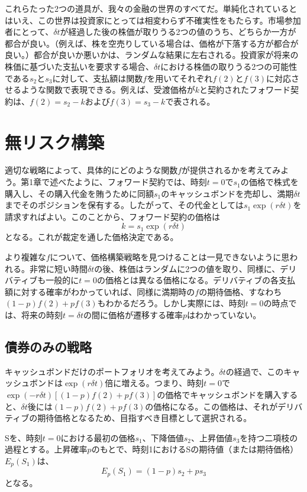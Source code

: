 \documentclass[uplatex,a4j,12pt,dvipdfmx]{jsarticle}
\begin{document}
これらたった2つの道具が、我々の金融の世界のすべてだ。単純化されているとはいえ、この世界は投資家にとっては相変わらず不確実性をもたらす。市場参加者にとって、$\delta t$が経過した後の株価が取りうる2つの値のうち、どちらか一方が都合が良い。（例えば、株を空売りしている場合は、価格が下落する方が都合が良い。）都合が良いか悪いかは、ランダムな結果に左右される。投資家が将来の株価に基づいた支払いを要求する場合、$\delta t$における株価の取りうる2つの可能性である$s_2$と$s_3$に対して、支払額は関数$f$を用いてそれぞれ$f(2)$と$f(3)$に対応させるような関数で表現できる。例えば、受渡価格が$k$と契約されたフォワード契約は、$f(2)=s_2-k$および$f(3)=s_3-k$で表される。

\section{無リスク構築}
適切な戦略によって、具体的にどのような関数$f$が提供されるかを考えてみよう。第1章で述べたように、フォワード契約では、時刻$t=0$で$s_1$の価格で株式を購入し、その購入代金を賄うために同額$s_1$のキャッシュボンドを売却し、満期$\delta t$までそのポジションを保有する。したがって、その代金としては$s_1 \exp(r\delta t)$を請求すればよい。このことから、フォワード契約の価格は\[k = s_1 \exp(r\delta t)\]となる。これが裁定を通した価格決定である。

より複雑な$f$について、価格構築戦略を見つけることは一見できないように思われる。非常に短い時間$\delta t$の後、株価はランダムに2つの値を取り、同様に、デリバティブも一般的に$t=0$の価格とは異なる価格になる。デリバティブの各支払額に対する確率がわかっていれば、同様に満期時の$f$の期待価格、すなわち$(1-p)f(2) + pf(3)$もわかるだろう。しかし実際には、時刻$t=0$の時点では、将来の時刻$t=\delta t$の間に価格が遷移する確率$p$はわかっていない。

\subsection{債券のみの戦略}
キャッシュボンドだけのポートフォリオを考えてみよう。$\delta t$の経過で、このキャッシュボンドは$\exp(r\delta t)$倍に増える。つまり、時刻$t=0$で$\exp(-r\delta t)[(1-p)f(2) + pf(3)]$の価格でキャッシュボンドを購入すると、$\delta t$後には$(1-p)f(2) + pf(3)$の価格になる。この価格は、それがデリバティブの期待価格となるため、目指すべき目標として選択される。

Sを、時刻$t=0$における最初の価格$s_1$、下降価値$s_2$、上昇価値$s_3$を持つ二項枝の過程とする。上昇確率$p$のもとで、時刻1におけるSの期待値（または期待価格）$E_p(S_1)$は、\[E_p(S_1) = (1-p)s_2 + ps_3\]となる。
\end{document}
